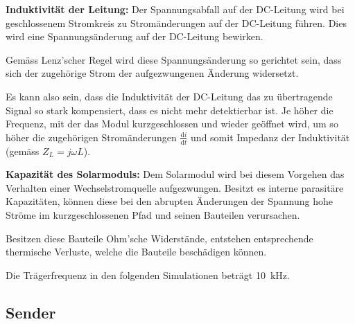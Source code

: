 \begin{symbols}
    \firmlist
    \item[\textbf{Induktivit\"at der Leitung:}]
        Der  Spannungsabfall   auf  der  DC-Leitung  wird   bei  geschlossenem
        Stromkreis zu Strom\"anderungen auf der DC-Leitung f\"uhren. Dies wird
        eine Spannungs\"anderung auf der DC-Leitung bewirken\footnotemark.

        Gem\"ass    Lenz'scher     Regel         wird    diese
        Spannungs\"anderung  so gerichtet  sein,  dass  sich der  zugeh\"orige
        Strom der aufgezwungenen \"Anderung widersetzt.

        Es  kann also  sein, dass  die  Induktivit\"at der  DC-Leitung das  zu
        \"ubertragende  Signal  so  stark  kompensiert,  dass  es  nicht  mehr
        detektierbar  ist. Je   h\"oher  die  Frequenz,  mit   der  das  Modul
        kurzgeschlossen  und  wieder  ge\"offnet   wird,  um  so  h\"oher  die
        zugeh\"origen Strom\"anderungen
        $\frac{\mathrm{d}i}{\mathrm{d}{t}}$
        und somit Impedanz der Induktivit\"at (gem\"ass
        $Z_L = j \omega L$).
    \item[\textbf{Kapazit\"at des Solarmoduls:}]
        Dem  Solarmodul   wird  bei   diesem  Vorgehen  das   Verhalten  einer
        Wechselstromquelle   aufgezwungen. Besitzt  es   interne  parasit\"are
        Kapazit\"aten,  k\"onnen  diese  bei  den  abrupten  \"Anderungen  der
        Spannung hohe Str\"ome im  kurzgeschlossenen Pfad und seinen Bauteilen
        verursachen.\footnotemark

        Besitzen    diese   Bauteile    Ohm'sche   Widerst\"ande,    entstehen
        entsprechende thermische  Verluste, welche die  Bauteile besch\"adigen
        k\"onnen.
\end{symbols}

Die    Tr\"agerfrequenz    in    den    folgenden    Simulationen    betr\"agt
\SI{10}{\kilo\hertz}.


\subsection{Sender}
\label{subsec:simu:ask:sensor}

